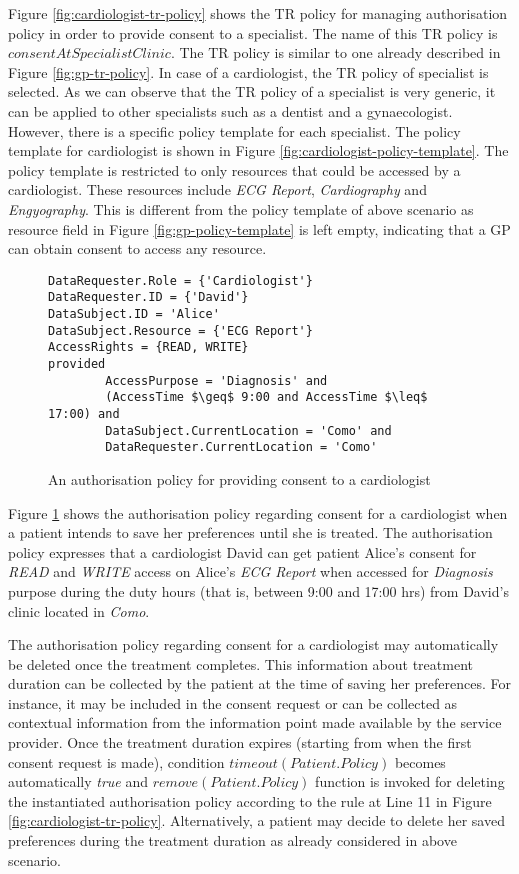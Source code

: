 \documentclass[10pt, conference, compsocconf]{IEEEtran}
\newcommand{\Keywords}{\lstset{keywords={provided,is,within,and,or,(,),TRUE,FALSE,tr-policy}}}
\begin{document}
Figure \ref{fig:cardiologist-tr-policy} shows the TR policy for managing authorisation policy in order to provide consent to a specialist. The name of this TR policy is $\mathit{consentAtSpecialistClinic}$. The TR policy is similar to one already described in Figure \ref{fig:gp-tr-policy}. In case of a cardiologist, the TR policy of specialist is selected. As we can observe that the TR policy of a specialist is very generic, it can be applied to other specialists such as a dentist and a gynaecologist. However, there is a specific policy template for each specialist. The policy template for cardiologist is shown in Figure \ref{fig:cardiologist-policy-template}. The policy template is restricted to only resources that could be accessed by a cardiologist. These resources include \emph{ECG Report}, \emph{Cardiography} and \emph{Engyography}. This is different from the policy template of above scenario as resource field in Figure \ref{fig:gp-policy-template} is left empty, indicating that a GP can obtain consent to access any resource.


\begin{figure} [htp]
\Keywords
\begin{lstlisting}[style=AMMA,breaklines,mathescape,rulesepcolor=\color{black}]
DataRequester.Role = {'Cardiologist'}
DataRequester.ID = {'David'}
DataSubject.ID = 'Alice'
DataSubject.Resource = {'ECG Report'}
AccessRights = {READ, WRITE}
provided
		AccessPurpose = 'Diagnosis' and
		(AccessTime $\geq$ 9:00 and AccessTime $\leq$ 17:00) and
		DataSubject.CurrentLocation = 'Como' and
		DataRequester.CurrentLocation = 'Como'
\end{lstlisting}
\caption{An authorisation policy for providing consent to a cardiologist}
\label{fig:cardiologist-authorisation-policy}
\end{figure}


Figure \ref{fig:cardiologist-authorisation-policy} shows the authorisation policy regarding consent for a cardiologist when a patient intends to save her preferences until she is treated. The authorisation policy expresses that a cardiologist David can get patient Alice's consent for \emph{READ} and \emph{WRITE} access on Alice's \emph{ECG Report} when accessed for \emph{Diagnosis} purpose during the duty hours (that is, between 9:00 and 17:00 hrs) from David's clinic located in \emph{Como}.

The authorisation policy regarding consent for a cardiologist may automatically be deleted once the treatment completes. This information about treatment duration can be collected by the patient at the time of saving her preferences. For instance, it may be included in the consent request or can be collected as contextual information from the information point made available by the service provider. Once the treatment duration expires (starting from when the first consent request is made), condition $\mathit{timeout(Patient.Policy)}$ becomes automatically \emph{true} and $\mathit{remove(Patient.Policy)}$ function is invoked for deleting the instantiated authorisation policy according to the rule at Line 11 in Figure \ref{fig:cardiologist-tr-policy}. Alternatively, a patient may decide to delete her saved preferences during the treatment duration as already considered in above scenario.
\end{document}
